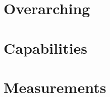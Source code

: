 \documentclass{dune}
\begin{document}


\section{Overarching}

\section{Capabilities}

\section{Measurements}

\end{document}
